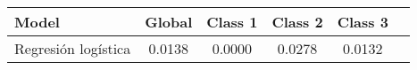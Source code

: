 \begin{tabular}{p{3cm}|c|c|c|c|c}
\toprule
               Model &  Global &  Class 1 &  Class 2 &  Class 3 \\
\midrule
 Regresión logística &  0.0138 &   0.0000 &   0.0278 &   0.0132 \\
\bottomrule
\end{tabular}

